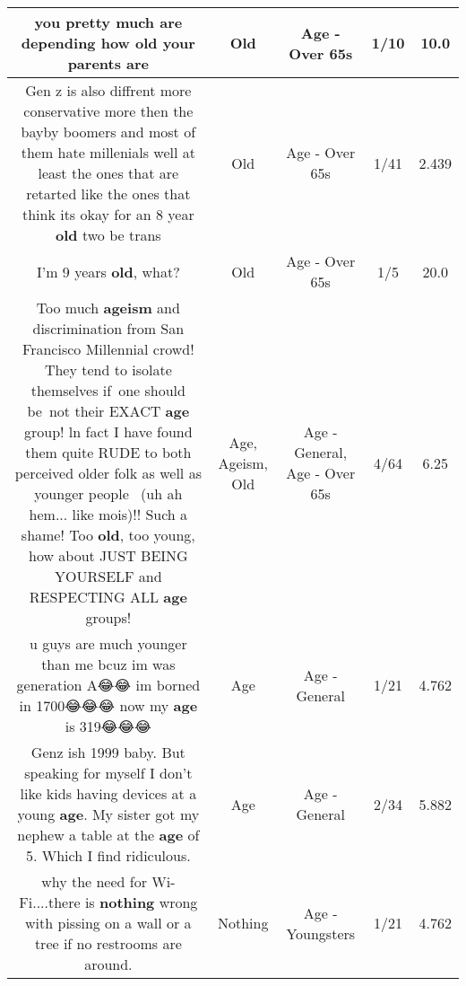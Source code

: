 \documentclass[11pt]{article}
\newlength\mylength
\begin{document}
\begin{center}
\begin{longtable}{|C{.65\mylength}|C{.30\mylength}|C{.12\mylength}|C{.12\mylength}|C{.12\mylength}|}
  \small you pretty much are depending how \textbf{old} your parents are\normalsize   & Old & Age - Over 65s & 1/10 & 10.0 \\  \hline
  \small Gen z is also diffrent more conservative more then the bayby boomers and most of them hate millenials well at least the ones that are retarted like the ones that think its okay for an 8 year \textbf{old} two be trans\normalsize   & Old & Age - Over 65s & 1/41 & 2.439 \\  \hline
  \small I'm 9 years \textbf{old}, what?\normalsize   & Old & Age - Over 65s & 1/5 & 20.0 \\  \hline
  \small Too much \textbf{ageism} and discrimination from San Francisco Millennial crowd! They tend to isolate themselves if one should be not their EXACT \textbf{age} group! ln fact I have found them quite RUDE to both perceived older folk as well as younger people  (uh ah hem... like mois)!! Such a shame! Too \textbf{old}, too young, how about JUST BEING YOURSELF and RESPECTING ALL \textbf{age} groups!\normalsize   & Age, Ageism, Old & Age - General, Age - Over 65s & 4/64 & 6.25 \\  \hline
  \small u guys are much younger than me bcuz im was generation A😂😂 im borned in 1700😂😂😂 now my \textbf{age} is 319😂😂😂\normalsize   & Age & Age - General & 1/21 & 4.762 \\  \hline
  \small Genz ish 1999 baby. But speaking for myself I don't like kids having devices at a young \textbf{age}. My sister got my nephew a table at the \textbf{age} of 5. Which I find ridiculous.\normalsize   & Age & Age - General & 2/34 & 5.882 \\  \hline
  \small why the need for Wi-Fi....there is \textbf{nothing} wrong with pissing on a wall or a tree if no restrooms are around.\normalsize   & Nothing & Age - Youngsters & 1/21 & 4.762 \\  \hline

\end{longtable}
\end{center}
\end{document}
